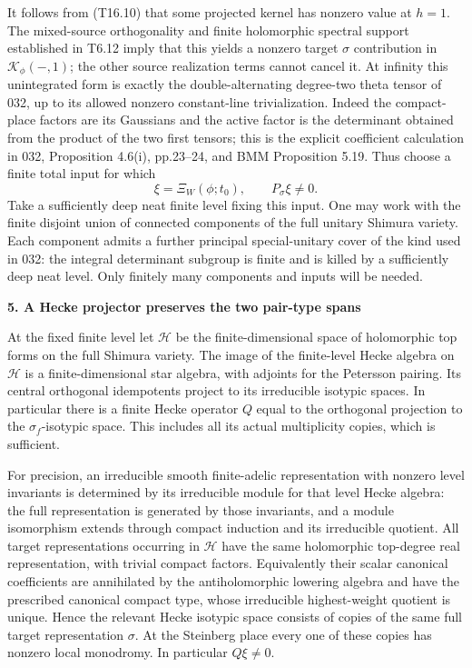 It follows from (T16.10) that some projected kernel has nonzero value at \(h=1\). The mixed-source orthogonality and finite holomorphic spectral support established in T6.12 imply that this yields a nonzero target \(\sigma\) contribution in \(\mathcal K_\phi(-,1)\); the other source realization terms cannot cancel it. At infinity this unintegrated form is exactly the double-alternating degree-two theta tensor of 032, up to its allowed nonzero constant-line trivialization. Indeed the compact-place factors are its Gaussians and the active factor is the determinant obtained from the product of the two first tensors; this is the explicit coefficient calculation in 032, Proposition 4.6(i), pp.23--24, and BMM Proposition 5.19. Thus choose a finite total input for which \[
\xi=\Xi_W(\phi;t_0),\qquad P_\sigma\xi\ne0.
\tag{T16.11}
\] Take a sufficiently deep neat finite level fixing this input. One may work with the finite disjoint union of connected components of the full unitary Shimura variety. Each component admits a further principal special-unitary cover of the kind used in 032: the integral determinant subgroup is finite and is killed by a sufficiently deep neat level. Only finitely many components and inputs will be needed.

\textbf{5. A Hecke projector preserves the two pair-type spans}

At the fixed finite level let \(\mathcal H\) be the finite-dimensional space of holomorphic top forms on the full Shimura variety. The image of the finite-level Hecke algebra on \(\mathcal H\) is a finite-dimensional star algebra, with adjoints for the Petersson pairing. Its central orthogonal idempotents project to its irreducible isotypic spaces. In particular there is a finite Hecke operator \(Q\) equal to the orthogonal projection to the \(\sigma_f\)-isotypic space. This includes all its actual multiplicity copies, which is sufficient.

For precision, an irreducible smooth finite-adelic representation with nonzero level invariants is determined by its irreducible module for that level Hecke algebra: the full representation is generated by those invariants, and a module isomorphism extends through compact induction and its irreducible quotient. All target representations occurring in \(\mathcal H\) have the same holomorphic top-degree real representation, with trivial compact factors. Equivalently their scalar canonical coefficients are annihilated by the antiholomorphic lowering algebra and have the prescribed canonical compact type, whose irreducible highest-weight quotient is unique. Hence the relevant Hecke isotypic space consists of copies of the same full target representation \(\sigma\). At the Steinberg place every one of these copies has nonzero local monodromy. In particular \(Q\xi\ne0\).

